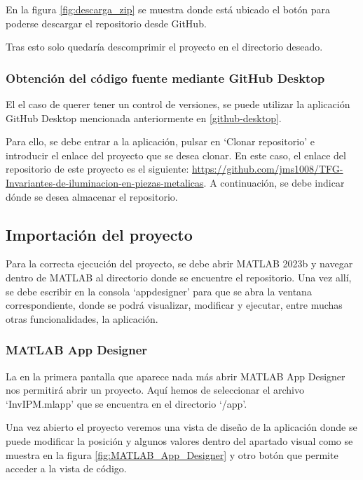 En la figura \ref{fig:descarga_zip} se muestra donde está ubicado el botón para poderse descargar el repositorio desde GitHub.

Tras esto solo quedaría descomprimir el proyecto en el directorio deseado.

\subsubsection{Obtención del código fuente mediante GitHub Desktop}\label{pbtención-del-código-fuente-mediante-github-desktop}

El el caso de querer tener un control de versiones, se puede utilizar la aplicación GitHub Desktop mencionada anteriormente en \ref{github-desktop}.

Para ello, se debe entrar a la aplicación, pulsar en `Clonar repositorio' e introducir el enlace del proyecto que se desea clonar. En este caso, el enlace del repositorio de este proyecto es el siguiente: \url{https://github.com/jms1008/TFG-Invariantes-de-iluminacion-en-piezas-metalicas}. A continuación, se debe indicar dónde se desea almacenar el repositorio.

\subsection{Importación del proyecto}\label{importación-del-proyecto}

Para la correcta ejecución del proyecto, se debe abrir MATLAB 2023b y navegar dentro de MATLAB al directorio donde se encuentre el repositorio. Una vez allí, se debe escribir en la consola `appdesigner' para que se abra la ventana correspondiente, donde se podrá visualizar, modificar y ejecutar, entre muchas otras funcionalidades, la aplicación.

\subsubsection{MATLAB App Designer}\label{matlab-app-designer}

La en la primera pantalla que aparece nada más abrir MATLAB App Designer nos permitirá abrir un proyecto. Aquí hemos de seleccionar el archivo `InvIPM.mlapp' que se encuentra en el directorio `/app'.

Una vez abierto el proyecto veremos una vista de diseño de la aplicación donde se puede modificar la posición y algunos valores dentro del apartado visual como se muestra en la figura \ref{fig:MATLAB_App_Designer} y otro botón que permite acceder a la vista de código.

